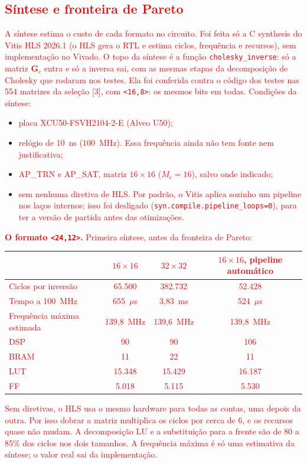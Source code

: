 \documentclass[11pt]{article}
\newcommand{\novo}[1]{\textcolor{red}{#1}}
\begin{document}
\subsection*{\novo{Síntese e fronteira de Pareto}}

\novo{A síntese estima o custo de cada formato no circuito. Foi feita só a C synthesis do Vitis
HLS 2026.1 (o HLS gera o RTL e estima ciclos, frequência e recursos), sem implementação no
Vivado. O topo da síntese é a função \texttt{cholesky\_inverse}: só a matriz $\mathbf G_c$ entra e
só a inversa sai, com as mesmas etapas da decomposição de Cholesky que rodaram nos testes. Ela foi
conferida contra o código dos testes nas 554 matrizes da seleção [3], com \texttt{<16,8>}: os
mesmos bits em todas. Condições da síntese:}
\begin{itemize}
  \item \novo{placa XCU50-FSVH2104-2-E (Alveo U50);}
  \item \novo{relógio de 10~ns (100~MHz). Essa frequência ainda não tem fonte nem justificativa;}
  \item \novo{AP\_TRN e AP\_SAT, matriz $16 \times 16$ ($M_c = 16$), salvo onde indicado;}
  \item \novo{sem nenhuma diretiva de HLS. Por padrão, o Vitis aplica sozinho um pipeline nos laços
        internos; isso foi desligado (\texttt{syn.compile.pipeline\_loops=0}), para ter a versão
        de partida antes das otimizações.}
\end{itemize}

\novo{\textbf{O formato \texttt{<24,12>}.} Primeira síntese, antes da fronteira de Pareto:}
\begin{center}
\small
\renewcommand{\arraystretch}{1.15}
\begin{tabular}{|l|c|c|c|}
\hline
 & \novo{$16 \times 16$} & \novo{$32 \times 32$} & \novo{$16 \times 16$, pipeline automático} \\
\hline
\novo{Ciclos por inversão} & \novo{65.500} & \novo{382.732} & \novo{52.428} \\
\novo{Tempo a 100~MHz} & \novo{655~$\mu$s} & \novo{3,83~ms} & \novo{524~$\mu$s} \\
\novo{Frequência máxima estimada} & \novo{139,8~MHz} & \novo{139,6~MHz} & \novo{139,8~MHz} \\
\novo{DSP} & \novo{90} & \novo{90} & \novo{106} \\
\novo{BRAM} & \novo{11} & \novo{22} & \novo{11} \\
\novo{LUT} & \novo{15.348} & \novo{15.429} & \novo{16.187} \\
\novo{FF} & \novo{5.018} & \novo{5.115} & \novo{5.530} \\
\hline
\end{tabular}
\end{center}
\novo{Sem diretivas, o HLS usa o mesmo hardware para todas as contas, uma depois da outra. Por isso
dobrar a matriz multiplica os ciclos por cerca de 6, e os recursos quase não mudam. A
decomposição LU e a substituição para a frente são de 80 a 85\% dos ciclos nos dois tamanhos.
A frequência máxima é só uma estimativa da síntese; o valor real sai da implementação.}
\end{document}
